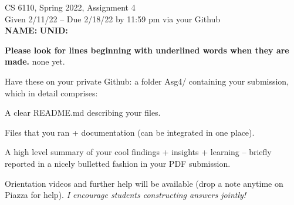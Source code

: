 \documentclass[11pt]{article}
\begin{document}

\newlength{\minpagw}
\settowidth{\minpagw}{\hspace{40em}}

\begin{center}
\begin{large}
  CS 6110, Spring 2022, Assignment 4  \\
  Given 2/11/22 -- Due 2/18/22 by 11:59 pm via your Github 
  \ \\
    {  {\Large\bf NAME: } \hfill {\Large\bf UNID: }\hspace{4cm} }
          \ \\
\end{large}

\end{center}

 {\bf Please look for lines beginning with underlined words when they are made.}
         {\tiny none yet.}

         Have these on your private Github:
         a folder Asg4/ containing your submission, which in detail comprises:
         \begin{compactitem}
         \item A clear README.md describing your files.
         \item Files that you ran + documentation (can be integrated in one place).
         \item A high level summary of your cool findings + insights + learning -- briefly reported in
           a nicely bulletted fashion in your PDF submission.
         \end{compactitem}

Orientation videos and further help will be available (drop a note anytime
on Piazza for help). {\em I encourage students constructing answers jointly!}
\end{document}
